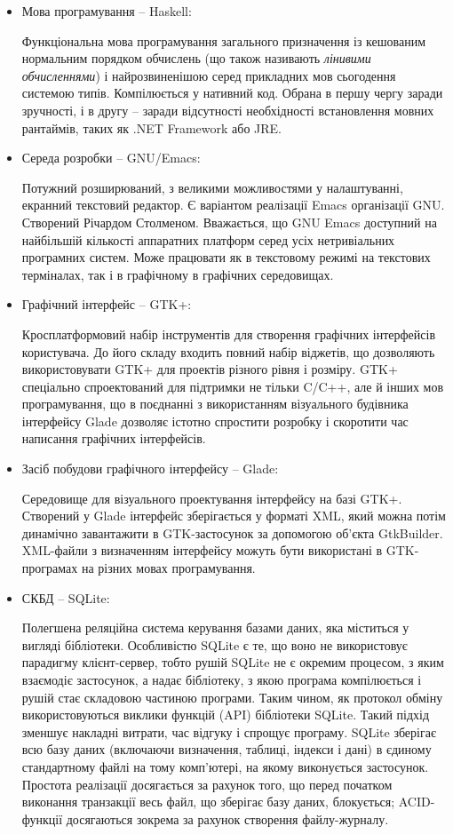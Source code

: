 \begin{itemize}[label=\Large$\diamond$]\itemsep1em

  \item Мова програмування -- Haskell:

    Функціональна мова програмування загального призначення із кешованим нормальним порядком обчислень (що також називають \emph{лінивими обчисленнями}) і найрозвиненішою серед прикладних мов сьогодення системою типів. Компілюється у нативний код. Обрана в першу чергу заради зручності, і в другу -- заради відсутності необхідності встановлення мовних рантаймів, таких як .NET Framework або JRE.

  \item Середа розробки -- GNU/Emacs:

    Потужний розширюваний, з великими можливостями у налаштуванні, екранний текстовий редактор. Є варіантом реалізації Emacs організації GNU. Створений Річардом Столменом. Вважається, що GNU Emacs доступний на найбільшій кількості аппаратних платформ серед усіх нетривіальних програмних систем. Може працювати як в текстовому режимі на текстових терміналах, так і в графічному в графічних середовищах.

  \item Графічний інтерфейс -- GTK+:

    Кросплатформовий набір інструментів для створення графічних інтерфейсів користувача. До його складу входить повний набір віджетів, що дозволяють використовувати GTK+ для проектів різного рівня і розміру. GTK+ спеціально спроектований для підтримки не тільки C/C++, але й інших мов програмування, що в поєднанні з використанням візуального будівника інтерфейсу Glade дозволяє істотно спростити розробку і скоротити час написання графічних інтерфейсів.

  \item Засіб побудови графічного інтерфейсу -- Glade:

    Середовище для візуального проектування інтерфейсу на базі GTK+. Створений у Glade інтерфейс зберігається у форматі XML, який можна потім динамічно завантажити в GTK-застосунок за допомогою об'єкта GtkBuilder. XML-файли з визначенням інтерфейсу можуть бути використані в GTK-програмах на різних мовах програмування.

  \item СКБД -- SQLite:

    Полегшена реляційна система керування базами даних, яка міститься у вигляді бібліотеки. Особливістю SQLite є те, що воно не використовує парадигму клієнт-сервер, тобто рушій SQLite не є окремим процесом, з яким взаємодіє застосунок, а надає бібліотеку, з якою програма компілюється і рушій стає складовою частиною програми. Таким чином, як протокол обміну використовуються виклики функцій (API) бібліотеки SQLite. Такий підхід зменшує накладні витрати, час відгуку і спрощує програму. SQLite зберігає всю базу даних (включаючи визначення, таблиці, індекси і дані) в єдиному стандартному файлі на тому комп'ютері, на якому виконується застосунок. Простота реалізації досягається за рахунок того, що перед початком виконання транзакції весь файл, що зберігає базу даних, блокується; ACID-функції досягаються зокрема за рахунок створення файлу-журналу.


\end{itemize}
